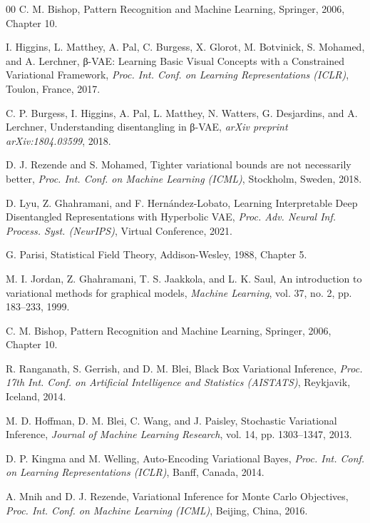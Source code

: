 \documentclass[final]{ws-ijseke}
\begin{document}
\begin{thebibliography}{00}
C. M. Bishop,
Pattern Recognition and Machine Learning,
Springer, 2006, Chapter 10.

I. Higgins, L. Matthey, A. Pal, C. Burgess, X. Glorot, M. Botvinick, S. Mohamed, and A. Lerchner,
β-VAE: Learning Basic Visual Concepts with a Constrained Variational Framework,
{\it Proc. Int. Conf. on Learning Representations (ICLR)}, Toulon, France, 2017.

C. P. Burgess, I. Higgins, A. Pal, L. Matthey, N. Watters, G. Desjardins, and A. Lerchner,
Understanding disentangling in β-VAE,
{\it arXiv preprint arXiv:1804.03599}, 2018.

D. J. Rezende and S. Mohamed,
Tighter variational bounds are not necessarily better,
{\it Proc. Int. Conf. on Machine Learning (ICML)}, Stockholm, Sweden, 2018.

D. Lyu, Z. Ghahramani, and F. Hernández-Lobato,
Learning Interpretable Deep Disentangled Representations with Hyperbolic VAE,
{\it Proc. Adv. Neural Inf. Process. Syst. (NeurIPS)}, Virtual Conference, 2021.

G. Parisi,
Statistical Field Theory,
Addison-Wesley, 1988, Chapter 5.

M. I. Jordan, Z. Ghahramani, T. S. Jaakkola, and L. K. Saul,
An introduction to variational methods for graphical models,
{\it Machine Learning}, vol. 37, no. 2, pp. 183–233, 1999.

C. M. Bishop,
Pattern Recognition and Machine Learning,
Springer, 2006, Chapter 10.

R. Ranganath, S. Gerrish, and D. M. Blei,
Black Box Variational Inference,
{\it Proc. 17th Int. Conf. on Artificial Intelligence and Statistics (AISTATS)}, Reykjavik, Iceland, 2014.

M. D. Hoffman, D. M. Blei, C. Wang, and J. Paisley,
Stochastic Variational Inference,
{\it Journal of Machine Learning Research}, vol. 14, pp. 1303–1347, 2013.

D. P. Kingma and M. Welling,
Auto-Encoding Variational Bayes,
{\it Proc. Int. Conf. on Learning Representations (ICLR)}, Banff, Canada, 2014.

A. Mnih and D. J. Rezende,
Variational Inference for Monte Carlo Objectives,
{\it Proc. Int. Conf. on Machine Learning (ICML)}, Beijing, China, 2016.


\end{thebibliography}
\end{document}
